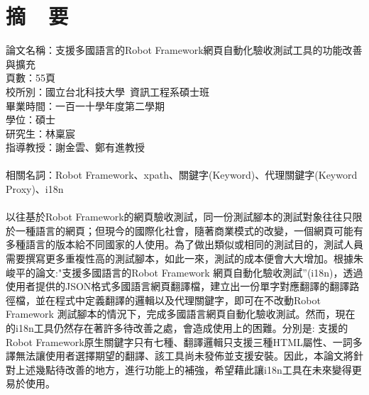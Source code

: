 \chapter*{摘~~要}


\noindent
論文名稱：支援多國語言的Robot Framework網頁自動化驗收測試工具的功能改善與擴充\\
頁數：55頁\\
校所別：國立台北科技大學~資訊工程系碩士班\\
畢業時間：一百一十學年度第二學期\\
學位：碩士\\
研究生：林稟宸\\
指導教授：謝金雲、鄭有進教授\\
\hspace*{\fill}\\
\noindent
相關名詞：Robot Framework、xpath、關鍵字(Keyword)、代理關鍵字(Keyword Proxy)、i18n\\
\hspace*{\fill}\\
%
\indent
以往基於Robot Framework的網頁驗收測試，同一份測試腳本的測試對象往往只限於一種語言的網頁；但現今的國際化社會，隨著商業模式的改變，一個網頁可能有多種語言的版本給不同國家的人使用。為了做出類似或相同的測試目的，測試人員需要撰寫更多重複性高的測試腳本，如此一來，測試的成本便會大大增加。根據朱峻平的論文:"支援多國語言的Robot Framework 網頁自動化驗收測試”(i18n)，透過使用者提供的JSON格式多國語言網頁翻譯檔，建立出一份單字對應翻譯的翻譯路徑檔，並在程式中定義翻譯的邏輯以及代理關鍵字，即可在不改動Robot Framework 測試腳本的情況下，完成多國語言網頁自動化驗收測試。然而，現在的i18n工具仍然存在著許多待改善之處，會造成使用上的困難。分別是: 支援的Robot Framework原生關鍵字只有七種、翻譯邏輯只支援三種HTML屬性、一詞多譯無法讓使用者選擇期望的翻譯、該工具尚未發佈並支援安裝。因此，本論文將針對上述幾點待改善的地方，進行功能上的補強，希望藉此讓i18n工具在未來變得更易於使用。
